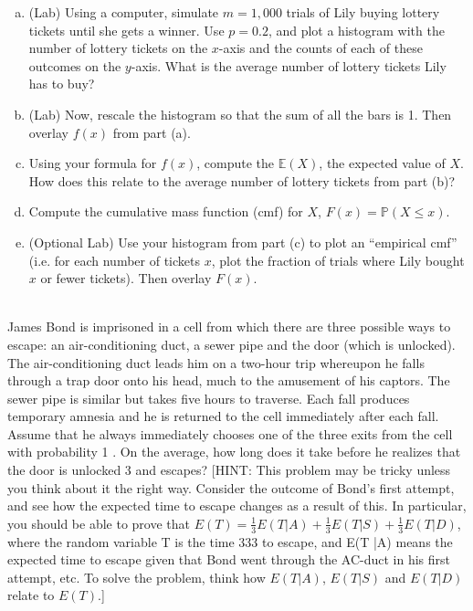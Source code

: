 \documentclass[]{article}
\newif\ifsolutions
\renewcommand{\answer}[1]{{\color{mydarkblue}\textbf{Solution:}#1}}
\begin{document}
\begin{qunlist}
\begin{enumerate}[a)]
\qpart
\item (Lab) Using a computer, simulate $m=1,000$ trials of Lily buying lottery tickets until she gets a winner. Use $p=0.2$, and plot a histogram with the number of lottery tickets on the $x$-axis and the counts of each of these outcomes on the $y$-axis.  What is the average number of lottery tickets Lily has to buy?

\qpart
\item (Lab) Now, rescale the histogram so that the sum of all the bars is 1.  Then overlay $f(x)$ from part (a).

\qpart
\item Using your formula for $f(x)$, compute the $\mathbb{E}(X)$, the expected value of $X$. How does this relate to the average number of lottery tickets from part (b)? %


\qpart
\item Compute the cumulative mass function (cmf) for $X$, $F(x) = \mathbb{P}(X \leq x)$.

\ifsolutions{ \answer{ 
	We can use the formula for a finite geometric series to find $F(x)$,
	\[ F(x) = p \sum_{y=1}^x (1-p)^{y-1} = p \cdot \frac{1 - (1-p)^x}{1 - (1-p)} = 1 - (1-p)^x. \]
}}\fi

\qpart
\item (Optional Lab) Use your histogram from part (c) to plot an ``empirical cmf'' (i.e. for each number of tickets $x$, plot the fraction of trials where Lily bought $x$ or fewer tickets). Then overlay $F(x)$.

\end{enumerate}





 \\
James Bond is imprisoned in a cell from which there are three possible ways to escape: an air-conditioning
duct, a sewer pipe and the door (which is unlocked). The air-conditioning duct leads him on a two-hour trip
whereupon he falls through a trap door onto his head, much to the amusement of his captors. The sewer pipe
is similar but takes five hours to traverse. Each fall produces temporary amnesia and he is returned to the
cell immediately after each fall. Assume that he always immediately chooses one of the three exits from the
cell with probability 1 . On the average, how long does it take before he realizes that the door is unlocked 3
and escapes?
[HINT: This problem may be tricky unless you think about it the right way. Consider the outcome of Bond's
first attempt, and see how the expected time to escape changes as a result of this. In particular, you should
be able to prove that $E(T) = \frac{1}{3}E(T|A) + \frac{1}{3}E(T|S) + \frac{1}{3}E(T|D)$, where the random variable T is the time 333
to escape, and E(T |A) means the expected time to escape given that Bond went through the AC-duct in his first attempt, etc. To solve the problem, think how $E(T |A)$, $E(T |S)$ and $E(T |D)$ relate to $E(T )$.]


\end{qunlist}
\end{document}
